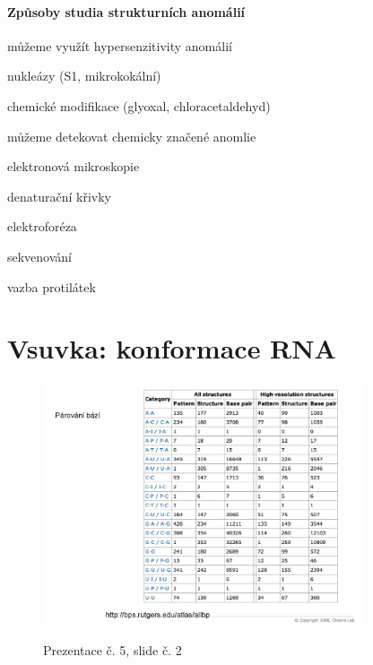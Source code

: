 \documentclass[DIV=8]{scrreprt}
\begin{document}
\paragraph{Způsoby studia strukturních anomálií}
\begin{myItemize}[nosep]
    \item můžeme využít hypersenzitivity anomálií
\begin{myItemize}[nosep]
    \item nukleázy (S1, mikrokokální)
    \item chemické modifikace (glyoxal, chloracetaldehyd)
\end{myItemize}

    \item můžeme detekovat chemicky značené anomlie
\begin{myItemize}[nosep]
    \item  elektronová mikroskopie
    \item denaturační křivky
    \item elektroforéza
    \item sekvenování
    \item vazba protilátek
\end{myItemize}

\end{myItemize}



\section{Vsuvka: konformace RNA} \label{Vsuvka: konformace RNA} \FloatBarrier


\begin{figure}
    \caption{Prezentace č. 5, slide č. 2}
    \includegraphics[width=0.85\textwidth]{slides-5/slide-2.jpg}
    \centering
    \label{slides-5-slide-2}
\end{figure}
\end{document}

